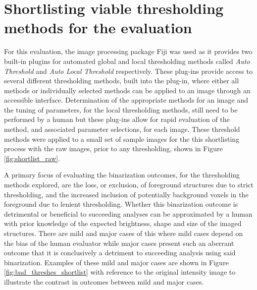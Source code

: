 \section{Shortlisting viable thresholding methods for the evaluation}
For this evaluation, the image processing package Fiji was used as it provides two built-in plugins for automated global and local thresholding methods called \textit{Auto Threshold} and \textit{Auto Local Threshold} respectively. These plug-ins provide access to several different thresholding methods, built into the plug-in, where either all methods or individually selected methods can be applied to an image through an accessible interface. Determination of the appropriate methods for an image and the tuning of parameters, for the local thresholding methods, still need to be performed by a human but these plug-ins allow for rapid evaluation of the method, and associated parameter selections, for each image. These threshold methods were applied to a small set of sample images for the this shortlisting process with the raw images, prior to any thresholding, shown in Figure \ref{fig:shortlist_raw}.\par 
A primary focus of evaluating the binarization outcomes, for the thresholding methods explored, are the loss, or exclusion, of foreground structures due to strict thresholding, and the increased inclusion of potentially background voxels in the foreground due to lenient thresholding. Whether this binarization outcome is detrimental or beneficial to succeeding analyses can be approximated by a human with prior knowledge of the expected brightness, shape and size of the imaged structures. There are mild and major cases of this where mild cases depend on the bias of the human evaluator while major cases present such an aberrant outcome that it is conclusively a detriment to succeeding analysis using said binarization. Examples of these mild and major cases are shown in Figure \ref{fig:bad_threshes_shortlist} with reference to the original intensity image to illustrate the contrast in outcomes between mild and major cases.


